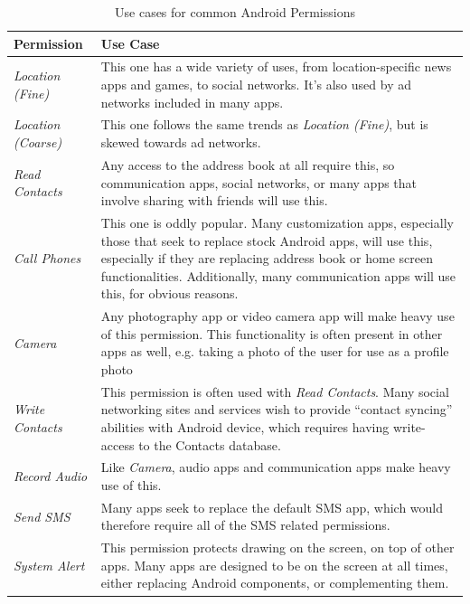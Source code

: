 \begin{table}[t]
\begin{small}
\begin{tabular}{p{3cm}|p{12.5cm}}
Permission & Use Case \\
\hline

\textit{Location (Fine)} & This one has a wide variety of uses, from location-specific news apps and games, to social networks. It's also used by ad networks included in many apps.  \\
\textit{Location (Coarse)} & This one follows the same trends as \textit{Location (Fine)}, but is skewed towards ad networks.  \\
\textit{Read Contacts} & Any access to the address book at all require this, so communication apps, social networks, or many apps that involve sharing with friends will use this.  \\
\textit{Call Phones} & This one is oddly popular. Many customization apps, especially those that seek to replace stock Android apps, will use this, especially if they are replacing address book or home screen functionalities. Additionally, many communication apps will use this, for obvious reasons.  \\
\textit{Camera} & Any photography app or video camera app will make heavy use of this permission. This functionality is often present in other apps as well, e.g. taking a photo of the user for use as a profile photo  \\
\textit{Write Contacts} & This permission is often used with \textit{Read Contacts}. Many social networking sites and services wish to provide ``contact syncing'' abilities with Android device, which requires having write-access to the Contacts database.  \\
\textit{Record Audio} & Like \textit{Camera}, audio apps and communication apps make heavy use of this.  \\
\textit{Send SMS} & Many apps seek to replace the default SMS app, which would therefore require all of the SMS related permissions.  \\
\textit{System Alert} & This permission protects drawing on the screen, on top of other apps. Many apps are designed to be on the screen at all times, either replacing Android components, or complementing them.  \\

\end{tabular}
\end{small}
\caption{Use cases for common Android Permissions}
\label{tab:permissionsanduses}
\end{table}

